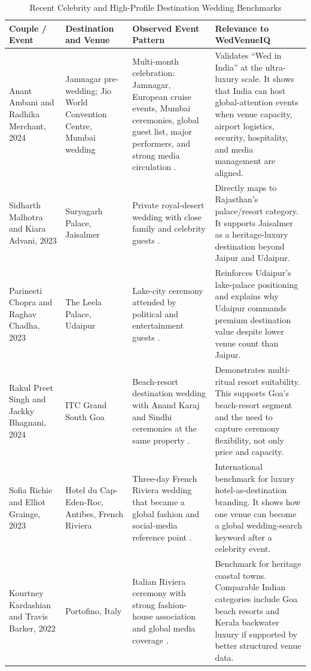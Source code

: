 \documentclass[conference]{IEEEtran}
\begin{document}
\begin{table}[htbp]
\caption{Recent Celebrity and High-Profile Destination Wedding Benchmarks}
\begin{center}
\scriptsize
\begin{tabular}{|p{}|p{}|p{}|p{}|}
\hline
\textbf{Couple / Event} & \textbf{Destination and Venue} & \textbf{Observed Event Pattern} & \textbf{Relevance to WedVenueIQ} \\
\hline
Anant Ambani and Radhika Merchant, 2024 & Jamnagar pre-wedding; Jio World Convention Centre, Mumbai wedding & Multi-month celebration: Jamnagar, European cruise events, Mumbai ceremonies, global guest list, major performers, and strong media circulation \cite{b16}. & Validates ``Wed in India'' at the ultra-luxury scale. It shows that India can host global-attention events when venue capacity, airport logistics, security, hospitality, and media management are aligned. \\
\hline
Sidharth Malhotra and Kiara Advani, 2023 & Suryagarh Palace, Jaisalmer & Private royal-desert wedding with close family and celebrity guests \cite{b17}. & Directly maps to Rajasthan's palace/resort category. It supports Jaisalmer as a heritage-luxury destination beyond Jaipur and Udaipur. \\
\hline
Parineeti Chopra and Raghav Chadha, 2023 & The Leela Palace, Udaipur & Lake-city ceremony attended by political and entertainment guests \cite{b18}. & Reinforces Udaipur's lake-palace positioning and explains why Udaipur commands premium destination value despite lower venue count than Jaipur. \\
\hline
Rakul Preet Singh and Jackky Bhagnani, 2024 & ITC Grand South Goa & Beach-resort destination wedding with Anand Karaj and Sindhi ceremonies at the same property \cite{b19}. & Demonstrates multi-ritual resort suitability. This supports Goa's beach-resort segment and the need to capture ceremony flexibility, not only price and capacity. \\
\hline
Sofia Richie and Elliot Grainge, 2023 & Hotel du Cap-Eden-Roc, Antibes, French Riviera & Three-day French Riviera wedding that became a global fashion and social-media reference point \cite{b20}. & International benchmark for luxury hotel-as-destination branding. It shows how one venue can become a global wedding-search keyword after a celebrity event. \\
\hline
Kourtney Kardashian and Travis Barker, 2022 & Portofino, Italy & Italian Riviera ceremony with strong fashion-house association and global media coverage \cite{b21}. & Benchmark for heritage coastal towns. Comparable Indian categories include Goa beach resorts and Kerala backwater luxury if supported by better structured venue data. \\

\end{tabular}
\end{center}
\end{table}
\end{document}

